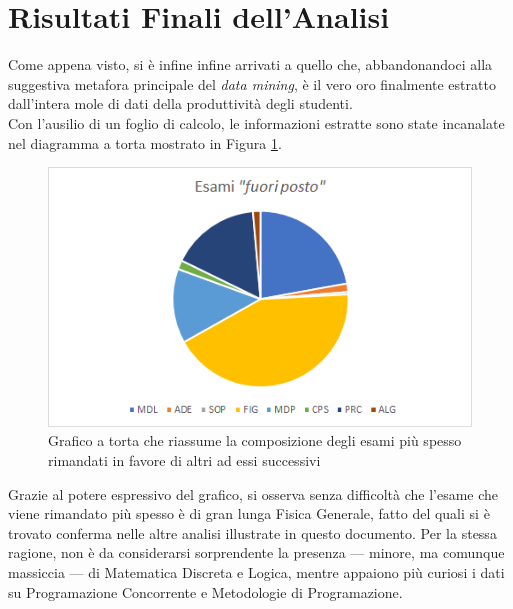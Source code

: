 \section{Risultati Finali dell'Analisi}

    Come appena visto, si è infine infine arrivati a quello che, abbandonandoci alla suggestiva metafora principale del \textit{data mining}, è il vero oro finalmente estratto dall'intera mole di dati della produttività degli studenti. \\

    Con l'ausilio di un foglio di calcolo, le informazioni estratte sono state incanalate nel diagramma a torta mostrato in Figura \ref{fine}. \\

      \begin{figure}
        \centering
        \caption{Grafico a torta che riassume la composizione degli esami più spesso rimandati in favore di altri ad essi successivi}
        \label{fine}
        \includegraphics[scale=0.85]{../seq/out_of_place.png}
    \end{figure}

    Grazie al potere espressivo del grafico, si osserva senza difficoltà che l'esame che viene rimandato più spesso è di gran lunga Fisica Generale, fatto del quali si è trovato conferma nelle altre analisi illustrate in questo documento. Per la stessa ragione, non è da considerarsi sorprendente la presenza --- minore, ma comunque massiccia --- di Matematica Discreta e Logica, mentre appaiono più curiosi i dati su Programazione Concorrente e Metodologie di Programazione.